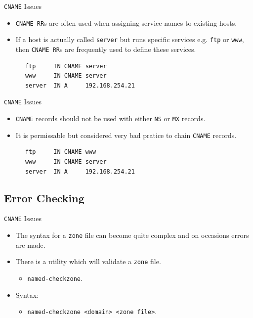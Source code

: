 \documentclass[xcolor=table]{beamer}
\begin{document}
\begin{frame}[fragile]{\texttt{CNAME} Issues}
  \begin{itemize}
    \item \texttt{CNAME RR}s are often used when assigning service names to existing hosts.
    \item If a host is actually called \texttt{server} but runs specific services e.g. \texttt{ftp} or \texttt{www}, then \texttt{CNAME RR}s are frequently used to define these services.
  \end{itemize}
  \begin{tcolorbox}
    \lstset{
      basicstyle=\scriptsize\ttfamily,
    }
    \begin{lstlisting}
      ftp     IN CNAME server
      www     IN CNAME server
      server  IN A     192.168.254.21
    \end{lstlisting}
  \end{tcolorbox}
\end{frame}

\begin{frame}[fragile]{\texttt{CNAME} Issues}
  \begin{itemize}
    \item \texttt{CNAME} records should not be used with either \texttt{NS} or \texttt{MX} records.
    \item It is permissable but considered very bad pratice to chain \texttt{CNAME} records.
  \end{itemize}
  \begin{tcolorbox}
    \lstset{
      basicstyle=\scriptsize\ttfamily,
    }
    \begin{lstlisting}
      ftp     IN CNAME www
      www     IN CNAME server
      server  IN A     192.168.254.21
    \end{lstlisting}
  \end{tcolorbox}
\end{frame}

\subsection{Error Checking}
\begin{frame}{\texttt{CNAME} Issues}
  \begin{itemize}
    \item The syntax for a \texttt{zone} file can become quite complex and on occasions errors are made.
    \item There is a utility which will validate a \texttt{zone} file.
      \begin{itemize}
        \item \texttt{named-checkzone}.
      \end{itemize}
    \item Syntax:
      \begin{itemize}
        \item \texttt{named-checkzone <domain> <zone file>}.
      \end{itemize}
  \end{itemize}
\end{frame}
\end{document}
